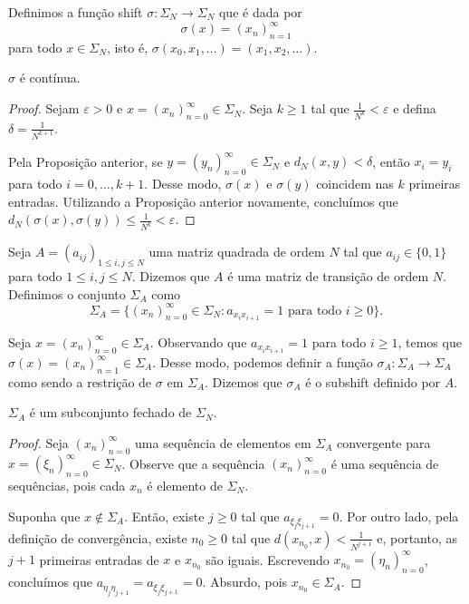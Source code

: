 Definimos a função shift $\sigma: \Sigma_N \to \Sigma_N$ que é dada por
$$\sigma(x) = (x_n)_{n=1}^\infty$$
para todo $x \in \Sigma_N$, isto é, $\sigma(x_0, x_1, \dots) = (x_1, x_2, \dots)$.

\begin{proposition}
$\sigma$ é contínua.
\end{proposition}

\begin{proof}
Sejam $\varepsilon > 0$ e $x = (x_n)_{n=0}^\infty \in \Sigma_N$. Seja $k \geq 1$ tal que $\frac{1}{N^k} < \varepsilon$ e defina $\delta = \frac{1}{N^{k+1}}$.

Pela Proposição anterior, se $y = (y_n)_{n=0}^\infty \in \Sigma_N$ e $d_N(x, y) < \delta$, então $x_i = y_i$ para todo $i = 0, \dots, k+1$. Desse modo, $\sigma(x)$ e $\sigma(y)$ coincidem nas $k$ primeiras entradas. Utilizando a Proposição anterior novamente, concluímos que $d_N(\sigma(x), \sigma(y)) \leq \frac{1}{N^k} < \varepsilon$.
\end{proof}


Seja $A = (a_{ij})_{1 \leq i,j \leq N}$ uma matriz quadrada de ordem $N$ tal que $a_{ij} \in \{ 0, 1 \}$ para todo $1 \leq i,j \leq N$. Dizemos que $A$ é uma matriz de transição de ordem $N$. Definimos o conjunto $\Sigma_A$ como
$$\Sigma_A = \{ (x_n)_{n=0}^{\infty} \in \Sigma_N : a_{x_i x_{i+1}} = 1 \textrm{ para todo } i \geq 0 \}.$$

Seja $x = (x_n)_{n=0}^{\infty} \in \Sigma_A$. Observando que $a_{x_i x_{i+1}} = 1$ para todo $i \geq 1$, temos que $\sigma(x) = (x_n)_{n=1}^\infty \in \Sigma_A$. Desse modo, podemos definir a função $\sigma_A: \Sigma_A \to \Sigma_A$ como sendo a restrição de $\sigma$ em $\Sigma_A$. Dizemos que $\sigma_A$ é o subshift definido por $A$.

\begin{proposition}
$\Sigma_A$ é um subconjunto fechado de $\Sigma_N$.
\end{proposition}


\begin{proof}
Seja $(x_n)_{n=0}^{\infty}$ uma sequência de elementos em $\Sigma_A$ convergente para $x = (\xi_n)_{n=0}^{\infty} \in \Sigma_N$. Observe que a sequência $(x_n)_{n=0}^{\infty}$ é uma sequência de sequências, pois cada $x_n$ é elemento de $\Sigma_N$.

Suponha que $x \notin \Sigma_A$. Então, existe $j \geq 0$ tal que $a_{\xi_j \xi_{j+1}} = 0$. Por outro lado, pela definição de convergência, existe $n_0 \geq 0$ tal que $d(x_{n_0}, x) < \frac{1}{N^{j+1}}$ e, portanto, as $j+1$ primeiras entradas de $x$ e $x_{n_0}$ são iguais. Escrevendo $x_{n_0} = (\eta_n)_{n=0}^\infty$, concluímos que $a_{\eta_j \eta_{j+1}} = a_{\xi_j \xi_{j+1}} = 0$. Absurdo, pois $x_{n_0} \in \Sigma_A$.
\end{proof}


